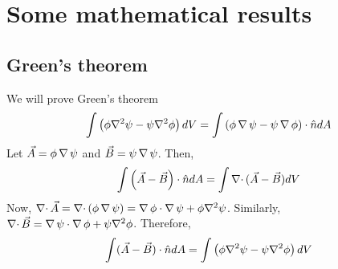 \chapter{Some mathematical results}
\section{Green's theorem}\label{c2sa1}
We will prove Green's theorem
\begin{equation}\label{c2sae1}
\int\left(\phi\nabla^2\psi - \psi\nabla^2\phi\right)dV = \int\left(\phi\operatorname{\nabla}{\psi} - \psi\operatorname{\nabla}{\phi}\right)\cdot\hat{n} dA
\end{equation}
Let $\vec{A} = \phi\operatorname{\nabla}{\psi}$ and $\vec{B} = \psi\operatorname{\nabla}{\psi}$. Then,
\[
\int\left(\vec{A} - \vec{B}\right)\cdot\hat{n} dA = \int\operatorname{\nabla\cdot}{(\vec{A} - \vec{B})}dV
\]
Now, $\operatorname{\nabla\cdot}{\vec{A}} = \operatorname{\nabla\cdot}{(\phi\operatorname{\nabla}{\psi})} = \operatorname{\nabla}{\phi}\cdot\operatorname{\nabla}{\psi} + \phi\nabla^2\psi$. Similarly, $\operatorname{\nabla\cdot}{\vec{B}} = \operatorname{\nabla}{\psi}\cdot\operatorname{\nabla}{\phi} + \psi\nabla^2\phi$. Therefore,
\[
\int(\vec{A} - \vec{B})\cdot\hat{n} dA = \int\left(\phi\nabla^2\psi - \psi\nabla^2\phi\right)dV
\]

